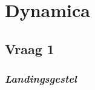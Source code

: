 \documentclass{article}
\begin{document}
\section{\textbf{Dynamica}}
\subsection{\textbf{Vraag 1}}
\subsubsection{\textbf{\textit{Landingsgestel}}}
\begin{maplegroup}
\begin{mapleinput}
\end{mapleinput}
\mapleresult
{}
\end{maplegroup}
\end{document}
